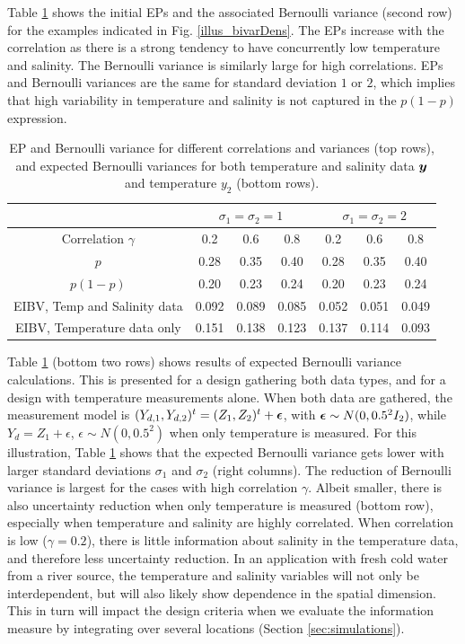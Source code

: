 Table \ref{tab:sim_rhoab} shows the initial EPs and the associated
Bernoulli variance (second row) for the examples indicated in Fig.
\ref{illus_bivarDens}. The EPs increase with the correlation as there
is a strong tendency to have concurrently low temperature and salinity. The Bernoulli variance is similarly large for high
correlations. EPs and Bernoulli variances are the same for standard
deviation $1$ or $2$, which implies that high variability in
temperature and salinity is not captured in the $p(1-p)$ expression.

\begin{table}[!h] \centering \caption{EP and Bernoulli variance for
    different correlations and variances (top rows), and expected
    Bernoulli variances for both temperature and salinity data ${\boldsymbol y}$ and 
    temperature $y_2$ (bottom rows).}
  \begin{tabular}{c|ccc|ccc}
 &\multicolumn{3}{c}{$\sigma_1=\sigma_2=1$} & \multicolumn{3}{c}{$\sigma_1=\sigma_2=2$} \\
\hline
Correlation $\gamma$ & 0.2 & 0.6 & 0.8 & 0.2 & 0.6 & 0.8 \\
\hline
$p$ & 0.28 & 0.35 & 0.40 & 0.28 & 0.35 & 0.40 \\ 
$p(1-p)$ & 0.20 & 0.23 & 0.24 & 0.20 & 0.23 & 0.24 \\ 
EIBV, Temp and Salinity data & 0.092 & 0.089 & 0.085 & 0.052 & 0.051 & 0.049 \\ 
EIBV, Temperature data only & 0.151 & 0.138 & 0.123 & 0.137 & 0.114 & 0.093 \\ 
\hline
\end{tabular}
\label{tab:sim_rhoab}
\end{table}

Table \ref{tab:sim_rhoab} (bottom two rows) shows results of expected
Bernoulli variance calculations. This is presented for a design
gathering both data types, and for a design with temperature
measurements alone. When both data are gathered, the measurement model is
$(Y_{d,1},Y_{d,2})^t=(Z_1,Z_2)^t+{\boldsymbol \epsilon}$, with ${\boldsymbol \epsilon} \sim N(0,0.5^2I_2)$, while $Y_d=Z_1+\epsilon$, $\epsilon \sim N(0,0.5^2)$ when only temperature is measured.
For this illustration, Table \ref{tab:sim_rhoab} shows that the
expected Bernoulli variance gets lower with larger standard deviations
$\sigma_1$ and $\sigma_2$ (right columns). The reduction of Bernoulli
variance is largest for the cases with high correlation
$\gamma$. Albeit smaller, there is also uncertainty reduction when
only temperature is measured (bottom row), especially when temperature
and salinity are highly correlated. When correlation is low
($\gamma=0.2$), there is little information about salinity in the
temperature data, and therefore less uncertainty reduction. In an
application with fresh cold water from a river source, the temperature
and salinity variables will not only be interdependent, but will also
likely show dependence in the spatial dimension. This in turn will
impact the design criteria when we evaluate the information measure by
integrating over several locations (Section \ref{sec:simulations}).

